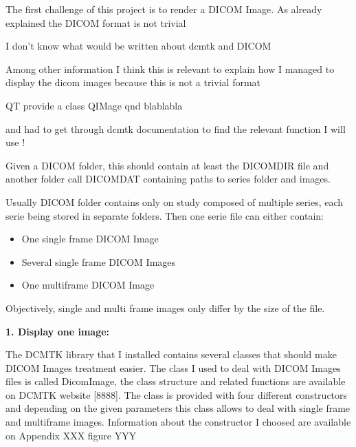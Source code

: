 The first challenge of this project is to render a DICOM Image. As already explained the DICOM format is not trivial 

I don't know what would be written about dcmtk and DICOM 


Among other information I think this is relevant to explain how I managed to display the dicom images because this is not a trivial format

QT provide a class QIMage qnd blablabla

and had to get through dcmtk documentation to find the relevant function I will use !

\newline \vspace{5mm}

Given a DICOM folder, this should contain at least the DICOMDIR file and another folder call DICOMDAT containing paths to series folder and images.

Usually DICOM folder contains only on study composed of multiple series, each serie being stored in separate folders. Then one serie file can either contain:

\begin{itemize}
	\item One single frame DICOM Image
	\item Several single frame DICOM Images
	\item One multiframe DICOM Image
\end{itemize}

Objectively, single and multi frame images only differ by the size of the file.

\newline \vspace{5mm}	
\textbf{1. Display one image:}

\newline \vspace{5mm}	

The DCMTK library that I installed contains several classes that should make DICOM Images treatment easier.
The class I used to deal with DICOM Images files is called DicomImage, the class structure and related functions are available on DCMTK website [8888].
The class is provided with four different constructors and depending on the given parameters this class allows to deal with single frame and multiframe images. Information about the constructor I choosed are available on Appendix XXX figure YYY


